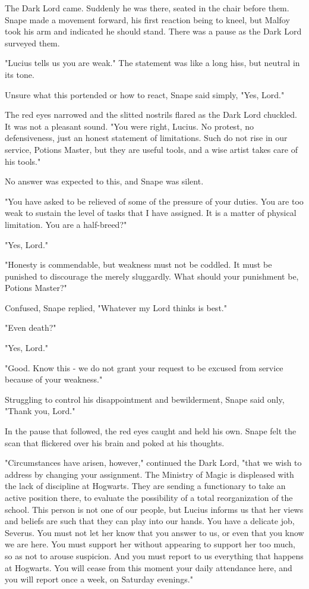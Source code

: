 \documentclass[a4paper,11pt]{article}
\begin{document}
The Dark Lord came. Suddenly he was there, seated in the chair before them. Snape made a movement forward, his first reaction being to kneel, but Malfoy took his arm and indicated he should stand. There was a pause as the Dark Lord surveyed them.

"Lucius tells us you are weak." The statement was like a long hiss, but neutral in its tone.

Unsure what this portended or how to react, Snape said simply, "Yes, Lord."

The red eyes narrowed and the slitted nostrils flared as the Dark Lord chuckled. It was not a pleasant sound. "You were right, Lucius. No protest, no defensiveness, just an honest statement of limitations. Such do not rise in our service, Potions Master, but they are useful tools, and a wise artist takes care of his tools."

No answer was expected to this, and Snape was silent.

"You have asked to be relieved of some of the pressure of your duties. You are too weak to sustain the level of tasks that I have assigned. It is a matter of physical limitation. You are a half-breed?"

"Yes, Lord."

"Honesty is commendable, but weakness must not be coddled. It must be punished to discourage the merely sluggardly. What should your punishment be, Potions Master?"

Confused, Snape replied, "Whatever my Lord thinks is best."

"Even death?"

"Yes, Lord."

"Good. Know this - we do not grant your request to be excused from service because of your weakness."

Struggling to control his disappointment and bewilderment, Snape said only, "Thank you, Lord."

In the pause that followed, the red eyes caught and held his own. Snape felt the scan that flickered over his brain and poked at his thoughts.

"Circumstances have arisen, however," continued the Dark Lord, "that we wish to address by changing your assignment. The Ministry of Magic is displeased with the lack of discipline at Hogwarts. They are sending a functionary to take an active position there, to evaluate the possibility of a total reorganization of the school. This person is not one of our people, but Lucius informs us that her views and beliefs are such that they can play into our hands. You have a delicate job, Severus. You must not let her know that you answer to us, or even that you know we are here. You must support her without appearing to support her too much, so as not to arouse suspicion. And you must report to us everything that happens at Hogwarts. You will cease from this moment your daily attendance here, and you will report once a week, on Saturday evenings."
\end{document}
